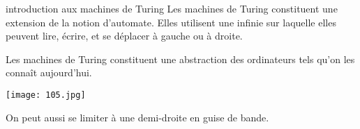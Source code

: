 \begin{remarque}{}{introduction aux machines de Turing}
    Les machines de Turing constituent une extension de la notion d'automate. Elles utilisent une infinie sur laquelle elles peuvent lire, écrire, et se déplacer à gauche ou à droite.

    \begin{center}
    \end{center}

    Les machines de Turing constituent une abstraction des ordinateurs tels qu'on les connaît aujourd'hui.
    \begin{center}
        \texttt{[image: 105.jpg]}
    \end{center}
    On peut aussi se limiter à une demi-droite en guise de bande.
\end{remarque}

